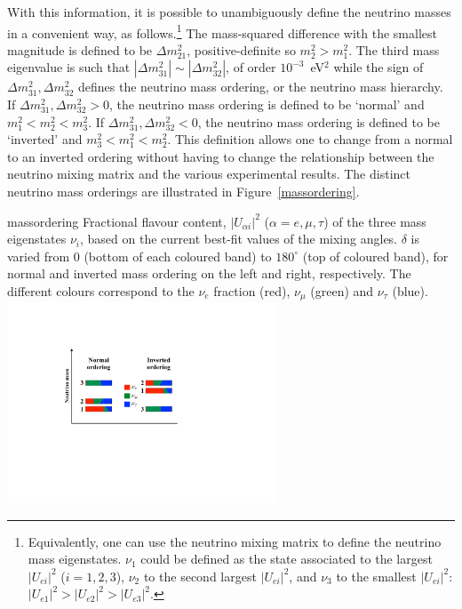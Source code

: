 With this information, it is possible to unambiguously define the neutrino masses in a convenient way, as follows.\footnote{Equivalently, one can use the neutrino mixing matrix to define the neutrino mass eigenstates. $\nu_1$ could be defined as the state associated to the largest $|U_{ei}|^2$ ($i=1,2,3$), $\nu_2$ to the second largest $|U_{ei}|^2$, and $\nu_3$ to the smallest $|U_{ei}|^2$: $|U_{e1}|^2>|U_{e2}|^2>|U_{e3}|^2$.} The mass-squared difference with the smallest magnitude is defined to be $\Delta m^2_{21}$, positive-definite so $m_2^2>m_1^2$. The third mass eigenvalue is such that $|\Delta m^2_{31}|\sim|\Delta m^2_{32}|$, of order $10^{-3}$~eV$^2$ while the sign of  $\Delta m^2_{31}, \Delta m^2_{32}$ defines the neutrino mass ordering, or the neutrino mass hierarchy. If $\Delta m^2_{31}, \Delta m^2_{32}>0$, the neutrino mass ordering is defined to be `normal' and $m_1^2<m_2^2<m_3^2$. If $\Delta m^2_{31}, \Delta m^2_{32}<0$, the neutrino mass ordering is defined to be `inverted' and $m_3^2<m_1^2<m_2^2$. This definition allows one to change from a normal to an inverted ordering without having to change the relationship between the neutrino mixing matrix and the various experimental results. The distinct neutrino mass orderings are illustrated in Figure~\ref{massordering}.
\begin{dunefigure}{massordering}{
   Fractional flavour content, $|U_{\alpha i}|^2$ ($\alpha = e, \mu, \tau$) of the three mass eigenstates $\nu_i$, based on the current best-fit values of the mixing angles. $\delta$ is varied from 0 (bottom of each coloured band) to $180^\circ$ (top of coloured band), for normal and inverted mass ordering on the left and right, respectively. The different colours correspond to the $\nu_e$ fraction (red), $\nu_\mu$ (green) and $\nu_\tau$ (blue). 
}
  \includegraphics[width=0.6\textwidth]{graphics/PastedGraphic-1.pdf}
\end{dunefigure}

